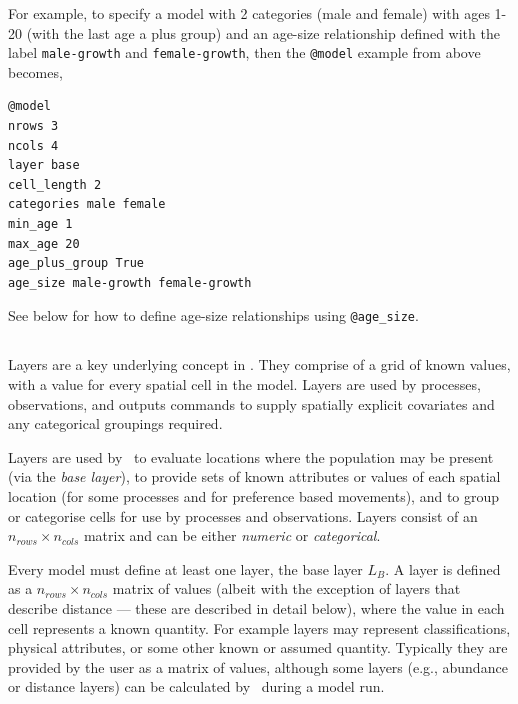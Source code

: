 For example, to specify a model with 2 categories (male and female) with ages 1-20 (with the last age a plus group) and an age-size relationship defined with the label \texttt{male-growth} and \texttt{female-growth}, then the \texttt{@model} example from above becomes,
{\small{\begin{verbatim}
@model
nrows 3
ncols 4
layer base
cell_length 2
categories male female
min_age 1
max_age 20
age_plus_group True
age_size male-growth female-growth
\end{verbatim}}}

See below for how to define age-size relationships using \texttt{@age\_size}. 



\subsection{\label{sec:layers}}

Layers are a key underlying concept in \SPM. They comprise of a grid of known values, with a value for every spatial cell in the model. Layers are used by processes, observations, and outputs commands to supply spatially explicit covariates and any categorical groupings required. 

Layers are used by \SPM\ to evaluate locations where the population may be present (via the \emph{base layer}), to provide sets of known attributes or values of each spatial location (for some processes and for preference based movements), and to group or categorise cells for use by processes and observations. Layers consist of an $n_{rows} \times n_{cols}$ matrix and can be either \emph{numeric} or \emph{categorical}. 

Every model must define at least one layer, the base layer $L_B$. A layer is defined as a $n_{rows} \times n_{cols}$ matrix of values (albeit with the exception of layers that describe distance --- these are described in detail below), where the value in each cell represents a known quantity. For example layers may represent classifications, physical attributes, or some other known or assumed quantity. Typically they are provided by the user as a matrix of values, although some layers (e.g., abundance or distance layers) can be calculated by \SPM\ during a model run. 

